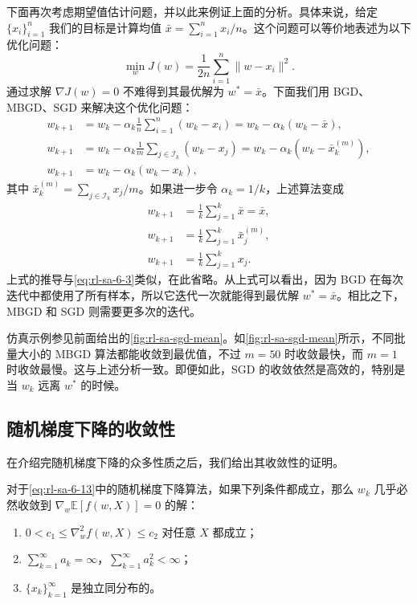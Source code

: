 下面再次考虑期望值估计问题，并以此来例证上面的分析。具体来说，给定 $\{x_i\}_{i=1}^n$ 我们的目标是计算均值 $\bar{x} = \sum_{i=1}^{n} x_i / n$。这个问题可以等价地表述为以下优化问题：
\begin{equation}
\min_w J(w) = \frac{1}{2n} \sum_{i=1}^{n} \| w - x_i \|^2.
\end{equation}
通过求解 $\nabla J(w) = 0$ 不难得到其最优解为 $w^* = \bar{x}$。下面我们用 BGD、MBGD、SGD 来解决这个优化问题：
\begin{align}
w_{k+1} &= w_k - \alpha_k \frac{1}{n} \sum_{i=1}^{n} (w_k - x_i) = w_k - \alpha_k (w_k - \bar{x}), \tag{BGD} \\
w_{k+1} &= w_k - \alpha_k \frac{1}{m} \sum_{j \in \mathcal{I}_k} (w_k - x_j) = w_k - \alpha_k \left( w_k - \bar{x}_k^{(m)} \right), \tag{MBGD} \\
w_{k+1} &= w_k - \alpha_k (w_k - x_k), \tag{SGD}
\end{align}
其中 $\bar{x}_k^{(m)} = \sum_{j \in \mathcal{I}_k} x_j / m$。如果进一步令 $\alpha_k = 1/k$，上述算法变成
\begin{align}
w_{k+1} &= \frac{1}{k} \sum_{j=1}^{k} \bar{x} = \bar{x}, \tag{BGD} \\
w_{k+1} &= \frac{1}{k} \sum_{j=1}^{k} \bar{x}_j^{(m)}, \tag{MBGD} \\
w_{k+1} &= \frac{1}{k} \sum_{j=1}^{k} x_j. \tag{SGD}
\end{align}
上式的推导与\eqref{eq:rl-sa-6-3}类似，在此省略。从上式可以看出，因为 BGD 在每次迭代中都使用了所有样本，所以它迭代一次就能得到最优解 $w^* = \bar{x}$。相比之下，MBGD 和 SGD 则需要更多次的迭代。

仿真示例参见前面给出的\cref{fig:rl-sa-sgd-mean}。如\cref{fig:rl-sa-sgd-mean}所示，不同批量大小的 MBGD 算法都能收敛到最优值，不过 $m = 50$ 时收敛最快，而 $m = 1$ 时收敛最慢。这与上述分析一致。即便如此，SGD 的收敛依然是高效的，特别是当 $w_k$ 远离 $w^*$ 的时候。

\subsection{随机梯度下降的收敛性}
\label{sec:rl-sa-sgd-conv}

在介绍完随机梯度下降的众多性质之后，我们给出其收敛性的证明。

\begin{theorem}[随机梯度下降的收敛性]\label{thm:rl-sa-sgd}
对于\eqref{eq:rl-sa-6-13}中的随机梯度下降算法，如果下列条件都成立，那么 $w_k$ 几乎必然收敛到 $\nabla_w \mathbb{E}[f(w, X)] = 0$ 的解：
\begin{enumerate}
  \item[(a)] $0 < c_1 \leqslant \nabla_w^2 f(w, X) \leqslant c_2$ 对任意 $X$ 都成立；
  \item[(b)] $\sum_{k=1}^{\infty} a_k = \infty$，$\sum_{k=1}^{\infty} a_k^2 < \infty$；
  \item[(c)] $\{x_k\}_{k=1}^{\infty}$ 是独立同分布的。
\end{enumerate}
\end{theorem}

